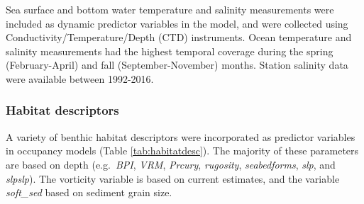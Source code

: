 \documentclass[
]{book}
\begin{document}
Sea surface and bottom water temperature and salinity measurements were included as dynamic predictor variables in the model, and were collected using Conductivity/Temperature/Depth (CTD) instruments. Ocean temperature and salinity measurements had the highest temporal coverage during the spring (February-April) and fall (September-November) months. Station salinity data were available between 1992-2016.

\hypertarget{habitat-descriptors}{%
\subsubsection{Habitat descriptors}\label{habitat-descriptors}}

A variety of benthic habitat descriptors were incorporated as predictor variables in occupancy models (Table \ref{tab:habitatdesc}). The majority of these parameters are based on depth (e.g.~\emph{BPI}, \emph{VRM}, \emph{Prcury}, \emph{rugosity}, \emph{seabedforms}, \emph{slp}, and \emph{slpslp}). The vorticity variable is based on current estimates, and the variable \emph{soft\_sed} based on sediment grain size.
\end{document}
